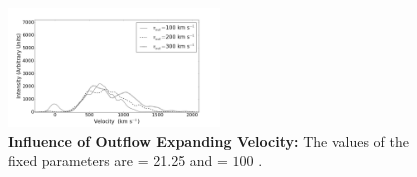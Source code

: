 \documentclass{latex/emulateapj}
\begin{document}
\begin{figure}[h!]
\begin{center}
  \includegraphics[width=0.5\textwidth]{./figures/inf_vout2_soft.png}
\end{center}
\caption{\textbf{Influence of Outflow Expanding Velocity:} The values of the fixed parameters are \lognh = 21.25 and \vrot = $100$ \kms.\\
\label{fig:influence_vout2}}
\end{figure}


%
%
%
%
\end{document}
